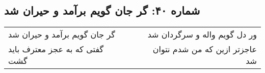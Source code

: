\begin{center}
\section*{شماره ۴۰: گر جان گویم برآمد و حیران شد}
\label{sec:040}
\begin{longtable}{l p{0.5cm} r}
گر جان گویم برآمد و حیران شد
&&
ور دل گویم واله و سرگردان شد
\\
گفتی که به عجز معترف باید گشت
&&
عاجزتر ازین که من شدم نتوان شد
\\
\end{longtable}
\end{center}
